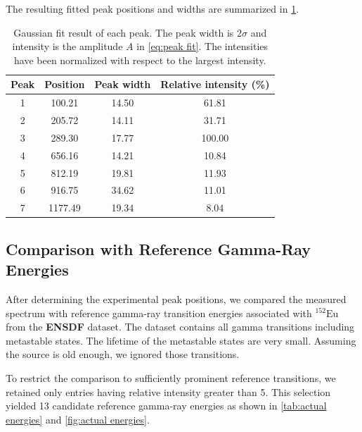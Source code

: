 The resulting fitted peak positions and widths are summarized in \cref{tab:detected peaks}.

\begin{table}[htbp]
    \centering
    \begin{tabular}{c c c c}
        \toprule
        Peak & Position & Peak width & Relative intensity (\%) \\
        \midrule
        1 & 100.21 & 14.50 & 61.81 \\
        2 & 205.72 & 14.11 & 31.71 \\
        3 & 289.30 & 17.77 & 100.00 \\
        4 & 656.16 & 14.21 & 10.84 \\
        5 & 812.19 & 19.81 & 11.93 \\
        6 & 916.75 & 34.62 & 11.01 \\
        7 & 1177.49 & 19.34 & 8.04 \\
        \bottomrule
    \end{tabular}
    \caption{Gaussian fit result of each peak. The peak width is $2\sigma$ and intensity is the amplitude $A$ in \cref{eq:peak fit}. The intensities have been normalized with respect to the largest intensity.}
    \label{tab:detected peaks}
\end{table}

\subsection{Comparison with Reference Gamma-Ray Energies}
After determining the experimental peak positions, we compared the measured spectrum with reference gamma-ray transition energies associated with $^{152}\mathrm{Eu}$ from the \textbf{ENSDF} dataset\cite{ensdf}. The dataset contains all gamma transitions including metastable states. The lifetime of the metastable states are very small\cite{enwiki:1352528506}. Assuming the source is old enough, we ignored those transitions.

To restrict the comparison to sufficiently prominent reference transitions, we retained only entries having relative intensity greater than 5. This selection yielded 13 candidate reference gamma-ray energies as shown in \cref{tab:actual energies} and \cref{fig:actual energies}.

